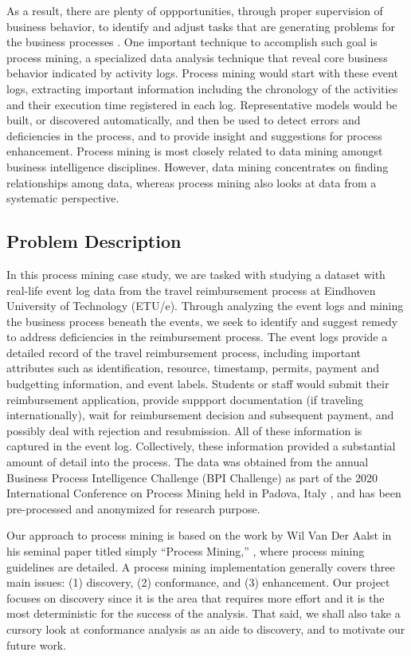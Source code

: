 \documentclass[conference]{IEEEtran}
\begin{document}
As a result, there are plenty of oppportunities, through
proper supervision of business behavior, to identify and adjust
tasks that are generating problems for the business processes
\cite{LeAl1994}.
One important technique to accomplish such goal is process mining, a
specialized data analysis technique that reveal core business behavior
indicated by activity logs.
Process mining would start with these event logs, extracting important
information including the chronology of the activities
 and their execution time registered in each log. Representative models
would be built, or discovered automatically,
and then be used to detect errors and deficiencies in the process,
and to provide insight and suggestions for process enhancement.
Process mining is most closely related to data mining 
amongst business intelligence disciplines. However,
data mining concentrates on finding relationships among data,
whereas process mining also looks at data from a systematic
perspective.

\subsection{Problem Description}

In this process mining case study, we are tasked with
studying a dataset with
real-life event log data from the travel reimbursement process at
Eindhoven University of Technology (ETU/e). Through analyzing the event
logs and mining the business process beneath the events, we seek to
identify and suggest remedy to address deficiencies in the reimbursement
process.
The event logs provide a detailed record of the travel reimbursement process,
including important attributes such as identification, resource,
timestamp, permits, payment and budgetting information, and event labels.
Students or staff would submit their reimbursement application,
provide suppport documentation (if traveling internationally), wait for
reimbursement decision and subsequent payment, and possibly deal with
rejection and resubmission. All of these information is captured in the
event log.
Collectively, these information provided a substantial amount of detail
into the process. 
The data was obtained from 
the annual Business Process Intelligence Challenge (BPI Challenge)
as part of
the 2020 International Conference on Process Mining held in Padova, Italy
\cite{BPI2020}, and has been
pre-processed and anonymized for research purpose.

Our approach to process mining is based on the work by
Wil Van Der Aalst in his seminal paper titled simply
``Process Mining,'' \cite{van2012},
where process mining guidelines are detailed.
A process mining implementation generally
covers three main issues: (1) discovery, (2) conformance,
and (3) enhancement.
Our project focuses on discovery since it is the area
that requires more effort and it is the most deterministic for the
success of the analysis. That said, we shall also take a cursory
look at conformance analysis as an aide to discovery,
 and to motivate our future work.
\end{document}
